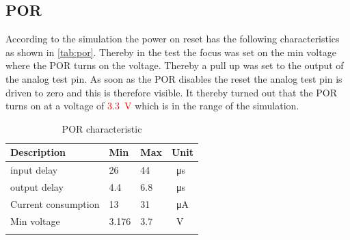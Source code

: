 \subsection{POR}
According to the simulation the power on reset has the following characteristics as shown in \autoref{tab:por}. Thereby in the test the focus was set on the min voltage where the POR turns on the voltage. Thereby a pull up was set to the output of the analog test pin. As soon as the POR disables the reset the analog test pin is driven to zero and this is therefore visible. It thereby turned out that the POR turns on at a voltage of \textcolor{red}{\qty{3.3}{\volt}} which is in the range of the simulation. 
\begin{longtable}{|p{3.5cm}|p{3.5cm}|p{3.5cm}|p{3.5cm}|}
	\hline
	\rowcolor{lightgray}
	\textbf{Description} &\textbf{Min} &\textbf{Max} & \textbf{Unit} \\ \hline
	
	input delay & 26 & 44 &\qty{}{\micro\second} \\ \hline
	output delay & 4.4 & 6.8 &\qty{}{\micro\second} \\ \hline
	Current consumption & 13 & 31 & \qty{}{\micro\ampere} \\ \hline
	Min voltage & 3.176& 3.7 & \qty{}{\volt} \\ \hline
	\caption{POR characteristic} %
	\label{tab:por}
\end{longtable}
